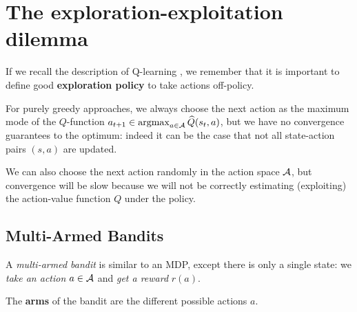 \documentclass[../course-notes.tex]{subfiles}
\begin{document}
\chapter{The exploration-exploitation dilemma}

If we recall the description of Q-learning , we remember that it is important to define good \textbf{exploration policy} to take actions off-policy.

For purely greedy approaches, we always choose the next action as the maximum mode of the $Q$-function $a_{t+1} \in \operatorname*{\mathrm{argmax}}_{a\in\mathcal{A}} \widehat{Q}(s_t, a)$, but we have no convergence guarantees to the optimum: indeed it can be the case that not all state-action pairs $(s,a)$ are updated.

We can also choose the next action randomly in the action space $\mathcal{A}$, but convergence will be slow because we will not be correctly estimating (exploiting) the action-value function $Q$ under the policy.


\section{Multi-Armed Bandits}

A \textit{multi-armed bandit} is similar to an MDP, except there is only a single state: we \textit{take an action} $a\in\mathcal{A}$ and \textit{get a reward} $r(a)$.

The \textbf{arms} of the bandit are the different possible actions $a$.
\end{document}
